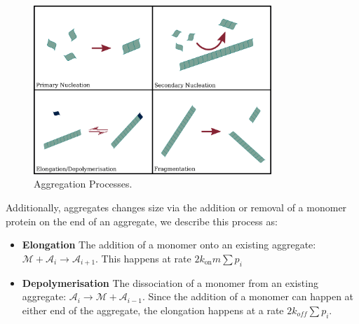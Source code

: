 \begin{figure}
    \centering
    \includegraphics[width=0.8\textwidth]{figures/4-agg-figs/aggProcesses.pdf}
    \caption{Aggregation Processes.}
    \label{fig:4-phase_sep_scheme}
\end{figure}

\noindent Additionally, aggregates changes size via the addition or removal of a monomer protein on the end of an aggregate, we describe this process as:
\begin{itemize}
    \item \textbf{Elongation} The addition of a monomer onto an existing aggregate: $\mathcal{M} + \mathcal{A}_{i} \rightarrow \mathcal{A}_{i+1}$. This happens at rate $2 k_\text{on} m \sum p_i$
    \item \textbf{Depolymerisation} The dissociation of a monomer from an existing aggregate: $\mathcal{A}_{i} \rightarrow \mathcal{M} + \mathcal{A}_{i-1}$. Since the addition of a monomer can happen at either end of the aggregate, the elongation happens at a rate $2 k_{off} \sum p_i$.
\end{itemize}

